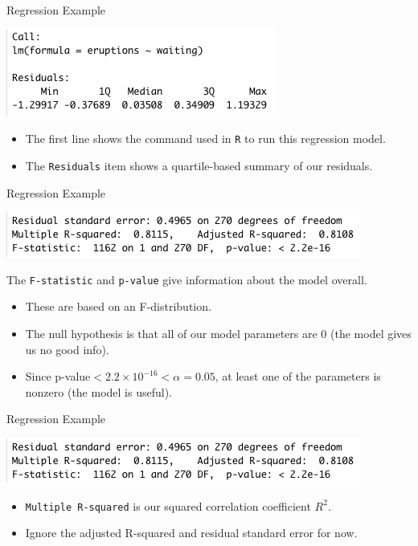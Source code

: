 \begin{frame}{Regression Example}
    \begin{center}
        \includegraphics[scale=0.6]{images/regcall.png}
    \end{center}
    \begin{itemize}
        \item The first line shows the command used in \texttt{R} to run this regression model.
        \item The \texttt{Residuals} item shows a quartile-based summary of our residuals.
    \end{itemize}
\end{frame}

\begin{frame}{Regression Example}
    \begin{center}
        \includegraphics[scale=0.6]{images/regfstat.png}
    \end{center}
    The \texttt{F-statistic} and \texttt{p-value} give information about the model overall. 
    \begin{itemize}
        \item These are based on an F-distribution.
        \item The null hypothesis is that all of our model parameters are 0 (the model gives us no good info).
        \item Since p-value$ < 2.2\times10^{-16} < \alpha = 0.05$, at least one of the parameters is nonzero (the model is useful).
    \end{itemize}
\end{frame}

\begin{frame}{Regression Example}
    \begin{center}
        \includegraphics[scale=0.6]{images/regfstat.png}
    \end{center}
    \begin{itemize}
        \item \texttt{Multiple R-squared} is our squared correlation coefficient $R^2$. 
        \item Ignore the adjusted R-squared and residual standard error for now.
    \end{itemize}
\end{frame}

